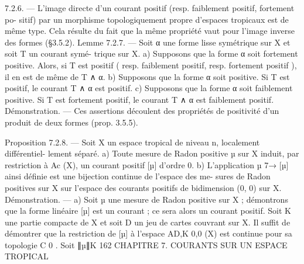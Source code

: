 \documentclass[
  10pt,
]{article}
\newenvironment{Shaded}{}{}
\newcommand{\NormalTok}[1]{#1}
\begin{document}
\begin{Shaded}
\begin{Highlighting}[]
\NormalTok{7.2.6. — L’image directe d’un courant positif (resp. faiblement positif, fortement po{-}}
\NormalTok{sitif) par un morphisme topologiquement propre d’espaces tropicaux est de même type.}
\NormalTok{Cela résulte du fait que la même propriété vaut pour l’image inverse des formes (§3.5.2).}
\NormalTok{Lemme 7.2.7. — Soit α une forme lisse symétrique sur X et soit T un courant symé{-}}
\NormalTok{trique sur X.}
\NormalTok{   a) Supposons que la forme α soit fortement positive. Alors, si T est positif ( resp.}
\NormalTok{faiblement positif, resp. fortement positif ), il en est de même de T ∧ α.}
\NormalTok{   b) Supposons que la forme α soit positive. Si T est positif, le courant T ∧ α est positif.}
\NormalTok{   c) Supposons que la forme α soit faiblement positive. Si T est fortement positif, le}
\NormalTok{courant T ∧ α est faiblement positif.}
\NormalTok{Démonstration. — Ces assertions découlent des propriétés de positivité d’un produit de}
\NormalTok{deux formes (prop. 3.5.5).}

\NormalTok{Proposition 7.2.8. — Soit X un espace tropical de niveau n, localement différentiel{-}}
\NormalTok{lement séparé.}
\NormalTok{  a) Toute mesure de Radon positive µ sur X induit, par restriction à Ac (X), un courant}
\NormalTok{positif [µ] d’ordre 0.}
\NormalTok{  b) L’application µ 7→ [µ] ainsi définie est une bijection continue de l’espace des me{-}}
\NormalTok{sures de Radon positives sur X sur l’espace des courants positifs de bidimension (0, 0)}
\NormalTok{sur X.}
\NormalTok{Démonstration. — a) Soit µ une mesure de Radon positive sur X ; démontrons que}
\NormalTok{la forme linéaire [µ] est un courant ; ce sera alors un courant positif. Soit K une partie}
\NormalTok{compacte de X et soit D un jeu de cartes couvrant sur X. Il suffit de démontrer que}
\NormalTok{la restriction de [µ] à l’espace AD,K}
\NormalTok{                                  0,0}
\NormalTok{                                      (X) est continue pour sa topologie C 0 . Soit ∥µ∥K}
\NormalTok{162                  CHAPITRE 7. COURANTS SUR UN ESPACE TROPICAL}


\end{Highlighting}
\end{Shaded}
\end{document}
